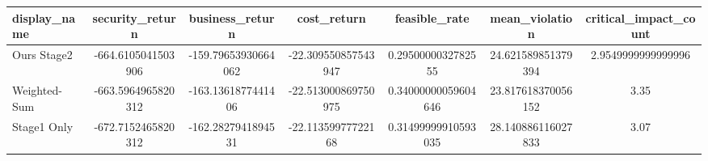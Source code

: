 \begin{tabular}{lcccccc}
\hline
display\_name & security\_return & business\_return & cost\_return & feasible\_rate & mean\_violation & critical\_impact\_count \\
\hline
Ours Stage2 & -664.6105041503906 & -159.79653930664062 & -22.309550857543947 & 0.2950000032782555 & 24.621589851379394 & 2.9549999999999996 \\
Weighted-Sum & -663.5964965820312 & -163.1361877441406 & -22.513000869750975 & 0.34000000059604646 & 23.817618370056152 & 3.35 \\
Stage1 Only & -672.7152465820312 & -162.2827941894531 & -22.11359977722168 & 0.31499999910593035 & 28.140886116027833 & 3.07 \\
\hline
\end{tabular}